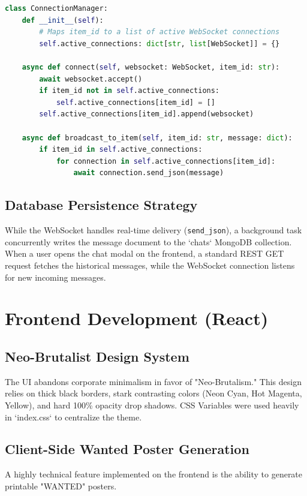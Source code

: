 \documentclass[12pt,a4paper]{report}
\begin{document}
\begin{lstlisting}[language=Python, caption=WebSocket Connection Manager]
class ConnectionManager:
    def __init__(self): 
        # Maps item_id to a list of active WebSocket connections
        self.active_connections: dict[str, list[WebSocket]] = {}

    async def connect(self, websocket: WebSocket, item_id: str):
        await websocket.accept()
        if item_id not in self.active_connections:
            self.active_connections[item_id] = []
        self.active_connections[item_id].append(websocket)

    async def broadcast_to_item(self, item_id: str, message: dict):
        if item_id in self.active_connections:
            for connection in self.active_connections[item_id]:
                await connection.send_json(message)
\end{lstlisting}

\section{Database Persistence Strategy}
While the WebSocket handles real-time delivery (\texttt{send\_json}), a background task concurrently writes the message document to the `chats` MongoDB collection. When a user opens the chat modal on the frontend, a standard REST GET request fetches the historical messages, while the WebSocket connection listens for new incoming messages.

\chapter{Frontend Development (React)}
\section{Neo-Brutalist Design System}
The UI abandons corporate minimalism in favor of "Neo-Brutalism." This design relies on thick black borders, stark contrasting colors (Neon Cyan, Hot Magenta, Yellow), and hard 100\% opacity drop shadows.
CSS Variables were used heavily in `index.css` to centralize the theme.

\section{Client-Side Wanted Poster Generation}
A highly technical feature implemented on the frontend is the ability to generate printable "WANTED" posters.
\end{document}
